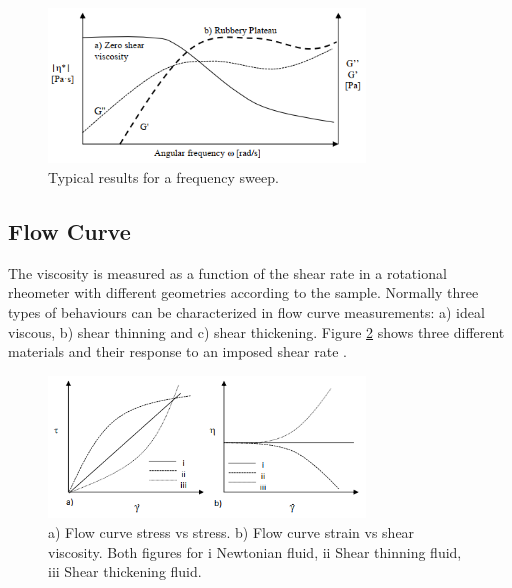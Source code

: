 \begin{figure}[th]
\centering
\includegraphics[width=0.75\textwidth]{./Figures/freqSweep.png}
\decoRule
\caption[Frequency Sweep]{Typical results for a frequency sweep. \cite{Flores2017}}
\label{fig:freqSweep}
\end{figure}

\subsection{Flow Curve}
The viscosity is measured as a function of the shear rate in a rotational rheometer with different geometries according to the sample. Normally three types of behaviours can be characterized in flow curve measurements: a) ideal viscous, b) shear thinning and c) shear thickening. Figure \ref{fig:flowCurve} shows three different materials and their response to an imposed shear rate \cite{Flores2017}.

\begin{figure}[th]
\centering
\includegraphics[width=0.75\textwidth]{./Figures/flowCurve.png}
\decoRule
\caption[Flow Curves]{a) Flow curve stress vs stress. b) Flow curve strain vs shear viscosity. Both figures for i Newtonian fluid, ii Shear thinning fluid, iii Shear thickening fluid. \cite{Flores2017}}
\label{fig:flowCurve}
\end{figure}






